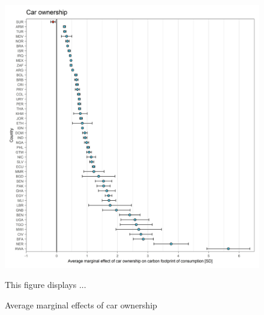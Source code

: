 \documentclass[12pt, a4paper]{article}
\newenvironment{subcaption}
{\strut
\vspace{-5pt}
\begin{minipage}[b]{0.9\textwidth}
  \hspace*{-\parindent}
  \footnotesize}
 {\end{minipage}}
\begin{document}
\begin{figure}[ht!]
  \centering
 \caption{Average marginal effects of car ownership} \label{fig:D1_Car}
  \includegraphics{Analysis_OLS_ME_Carbon_Footprint/AME_OLS_FP_car.01}
  \begin{subcaption}
    This figure displays ...
  \end{subcaption}

\end{figure}

\clearpage
\end{document}
